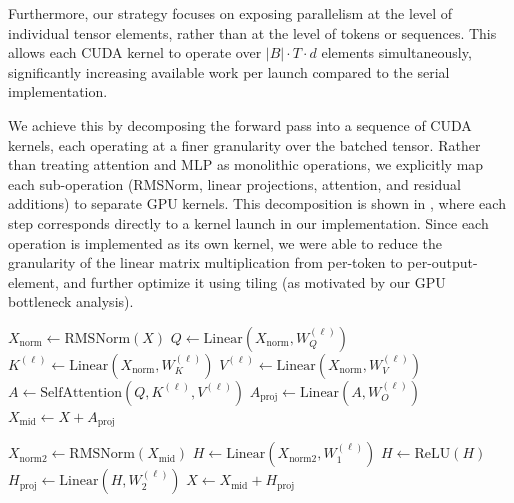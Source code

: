 Furthermore, our strategy focuses on exposing parallelism at the level of individual tensor elements, rather than at the level of tokens or sequences. This allows each CUDA kernel to operate over $|B| \cdot T \cdot d$ elements simultaneously, significantly increasing available work per launch compared to the serial implementation. 

We achieve this by decomposing the forward pass into a sequence of CUDA kernels, each operating at a finer granularity over the batched tensor. Rather than treating attention and MLP as monolithic operations, we explicitly map each sub-operation (RMSNorm, linear projections, attention, and residual additions) to separate GPU kernels. This decomposition is shown in , where each step corresponds directly to a kernel launch in our implementation. Since each operation is implemented as its own kernel, we were able to reduce the granularity of the linear matrix multiplication from per-token to per-output-element, and further optimize it using tiling (as motivated by our GPU bottleneck analysis).
\begin{algorithm}[H]
\caption{Layer-by-Layer GPU Forward Pass}
\label{alg:layer}
\begin{algorithmic}

    \State \textcolor{attncolor}{$X_{\text{norm}} \gets \text{RMSNorm}(X)$} \textcolor{attncolor}{}
    \State \textcolor{attncolor}{$Q \gets \text{Linear}(X_{\text{norm}}, W_Q^{(\ell)})$}
    \State \textcolor{attncolor}{$K^{(\ell)} \gets \text{Linear}(X_{\text{norm}}, W_K^{(\ell)})$}
    \State \textcolor{attncolor}{$V^{(\ell)} \gets \text{Linear}(X_{\text{norm}}, W_V^{(\ell)})$}
    \State \textcolor{attncolor}{$A \gets \text{SelfAttention}(Q, K^{(\ell)}, V^{(\ell)})$}
    \State \textcolor{attncolor}{$A_{\text{proj}} \gets \text{Linear}(A, W_O^{(\ell)})$}
    \State \textcolor{attncolor}{$X_{\text{mid}} \gets X + A_{\text{proj}}$}

    \State \textcolor{mlpcolor}{$X_{\text{norm2}} \gets \text{RMSNorm}(X_{\text{mid}})$} \textcolor{mlpcolor}{}
    \State \textcolor{mlpcolor}{$H \gets \text{Linear}(X_{\text{norm2}}, W_1^{(\ell)})$}
    \State \textcolor{mlpcolor}{$H \gets \text{ReLU}(H)$}
    \State \textcolor{mlpcolor}{$H_{\text{proj}} \gets \text{Linear}(H, W_2^{(\ell)})$}
    \State \textcolor{mlpcolor}{$X \gets X_{\text{mid}} + H_{\text{proj}}$}

\EndFor
\end{algorithmic}
\end{algorithm}

